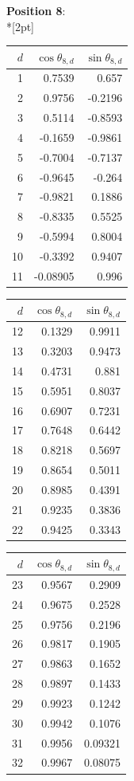 \noindent \textbf{Position 8}:\\*[2pt]
{\tablefont \begin{tabular}[t]{r|rr}
$d$ & $\cos\theta_{8,d}$ & $\sin\theta_{8,d}$ \\\hline
1 & 0.7539 & 0.657 \\
2 & 0.9756 & -0.2196 \\
3 & 0.5114 & -0.8593 \\
4 & -0.1659 & -0.9861 \\
5 & -0.7004 & -0.7137 \\
6 & -0.9645 & -0.264 \\
7 & -0.9821 & 0.1886 \\
8 & -0.8335 & 0.5525 \\
9 & -0.5994 & 0.8004 \\
10 & -0.3392 & 0.9407 \\
11 & -0.08905 & 0.996
\end{tabular}\kern4pt
\begin{tabular}[t]{r|rr}
$d$ & $\cos\theta_{8,d}$ & $\sin\theta_{8,d}$ \\\hline
12 & 0.1329 & 0.9911 \\
13 & 0.3203 & 0.9473 \\
14 & 0.4731 & 0.881 \\
15 & 0.5951 & 0.8037 \\
16 & 0.6907 & 0.7231 \\
17 & 0.7648 & 0.6442 \\
18 & 0.8218 & 0.5697 \\
19 & 0.8654 & 0.5011 \\
20 & 0.8985 & 0.4391 \\
21 & 0.9235 & 0.3836 \\
22 & 0.9425 & 0.3343
\end{tabular}\kern4pt
\begin{tabular}[t]{r|rr}
$d$ & $\cos\theta_{8,d}$ & $\sin\theta_{8,d}$ \\\hline
23 & 0.9567 & 0.2909 \\
24 & 0.9675 & 0.2528 \\
25 & 0.9756 & 0.2196 \\
26 & 0.9817 & 0.1905 \\
27 & 0.9863 & 0.1652 \\
28 & 0.9897 & 0.1433 \\
29 & 0.9923 & 0.1242 \\
30 & 0.9942 & 0.1076 \\
31 & 0.9956 & 0.09321 \\
32 & 0.9967 & 0.08075 \\

\end{tabular}}
